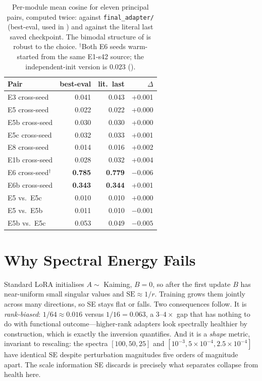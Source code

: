 \documentclass[11pt]{article}
\begin{document}
\begin{table}[!htbp]
\centering
\small
\begin{tabular}{lrrr}
\toprule
\textbf{Pair} & \textbf{best-eval} & \textbf{lit.\ last} & \textbf{$\Delta$} \\
\midrule
E3 cross-seed       & 0.041 & 0.043 & +0.001 \\
E5 cross-seed       & 0.022 & 0.022 & +0.000 \\
E5b cross-seed      & 0.030 & 0.030 & +0.000 \\
E5c cross-seed      & 0.032 & 0.033 & +0.001 \\
E8 cross-seed       & 0.014 & 0.016 & +0.002 \\
E1b cross-seed      & 0.028 & 0.032 & +0.004 \\
E6 cross-seed$^{\dagger}$  & \textbf{0.785} & \textbf{0.779} & $-0.006$ \\
E6b cross-seed      & \textbf{0.343} & \textbf{0.344} & +0.001 \\
E5 vs.\ E5c         & 0.010 & 0.010 & +0.000 \\
E5 vs.\ E5b         & 0.011 & 0.010 & $-0.001$ \\
E5b vs.\ E5c        & 0.053 & 0.049 & $-0.005$ \\
\bottomrule
\end{tabular}
\caption{Per-module mean cosine for eleven principal pairs, computed twice: against \texttt{final\_adapter/} (best-eval, used in ) and against the literal last saved checkpoint. The bimodal structure of  is robust to the choice. $^{\dagger}$Both E6 seeds warm-started from the same E1-s42 source; the independent-init version is $0.023$ ().}
\label{tab:lastckpt}
\end{table}

\section{Why Spectral Energy Fails}
\label{app:why_se_fails}

Standard LoRA initialises $A \sim$ Kaiming, $B{=}0$, so after the first update $B$ has near-uniform small singular values and $\text{SE} \approx 1/r$. Training grows them jointly across many directions, so SE stays flat or falls. Two consequences follow. It is \emph{rank-biased}: $1/64 \approx 0.016$ versus $1/16 = 0.063$, a $3$--$4\times$ gap that has nothing to do with functional outcome---higher-rank adapters look spectrally healthier by construction, which is exactly the inversion  quantifies. And it is a \emph{shape} metric, invariant to rescaling: the spectra $[100,50,25]$ and $[10^{-3}, 5{\times}10^{-4}, 2.5{\times}10^{-4}]$ have identical SE despite perturbation magnitudes five orders of magnitude apart. The scale information SE discards is precisely what separates collapse from health here.
\end{document}
